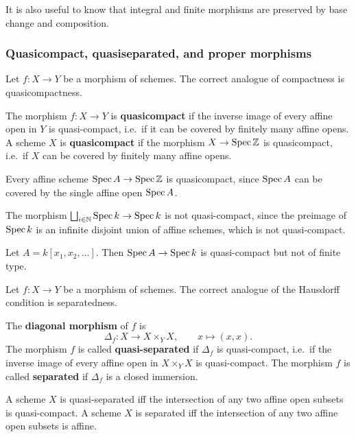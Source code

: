 \documentclass[12pt]{article}
\begin{document}
It is also useful to know that integral and finite morphisms are preserved by base change and composition.


\subsubsection{Quasicompact, quasiseparated, and proper morphisms}

Let $f:X\to Y$ be a morphism of schemes. The correct analogue of compactness is quasicompactness.
\begin{definition}
    The morphism $f:X\to Y$ is \textbf{quasicompact} if the inverse image of every affine open in $Y$ is quasi-compact, i.e.\ if it can be covered by finitely many affine opens. A scheme $X$ is \textbf{quasicompact} if the morphism $X\to \operatorname{Spec} \mathbb Z$ is quasicompact, i.e.\ if $X$ can be covered by finitely many affine opens.
\end{definition}

\begin{example}
    Every affine scheme $\operatorname{Spec} A \to \operatorname{Spec} \mathbb Z$ is quasicompact, since $\operatorname{Spec} A$ can be covered by the single affine open $\operatorname{Spec} A$.
\end{example}

\begin{example}
    The morphism $\bigsqcup_{i\in \mathbb N} \operatorname{Spec} k \to \operatorname{Spec} k$ is not quasi-compact, since the preimage of $\operatorname{Spec} k$ is an infinite disjoint union of affine schemes, which is not quasi-compact.
\end{example}

\begin{example}
    Let $A = k[x_1,x_2,\dots]$. Then $\operatorname{Spec} A \to \operatorname{Spec} k$ is quasi-compact but not of finite type.
\end{example}

Let $f:X\to Y$ be a morphism of schemes. The correct analogue of the Hausdorff condition is separatedness.

\begin{definition}
    The \textbf{diagonal morphism} of $f$ is
    \[
        \Delta_f:X\to X\times_Y X,
        \qquad x\mapsto (x,x).
    \]
    The morphism $f$ is called \textbf{quasi-separated} if $\Delta_f$ is quasi-compact, i.e.\ if the inverse image of every affine open in $X\times_Y X$ is quasi-compact. The morphism $f$ is called \textbf{separated} if $\Delta_f$ is a closed immersion.
\end{definition}

\begin{remark}
    A scheme $X$ is quasi-separated iff the intersection of any two affine open subsets is quasi-compact. A scheme $X$ is separated iff the intersection of any two affine open subsets is affine.
\end{remark}
\end{document}
